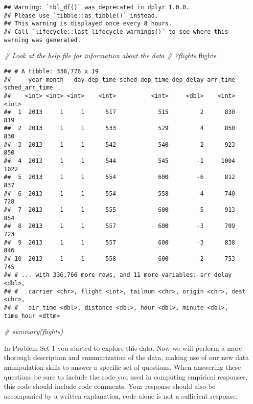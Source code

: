 \documentclass[
]{article}
\newenvironment{Shaded}{\begin{snugshade}}{\end{snugshade}}
\newcommand{\CommentTok}[1]{\textcolor[rgb]{0.56,0.35,0.01}{\textit{#1}}}
\newcommand{\NormalTok}[1]{#1}
\begin{document}
\begin{verbatim}
## Warning: `tbl_df()` was deprecated in dplyr 1.0.0.
## Please use `tibble::as_tibble()` instead.
## This warning is displayed once every 8 hours.
## Call `lifecycle::last_lifecycle_warnings()` to see where this warning was generated.
\end{verbatim}

\begin{Shaded}
\begin{Highlighting}[]
\CommentTok{\# Look at the help file for information about the data}
\CommentTok{\# ?flights}
\NormalTok{flights}
\end{Highlighting}
\end{Shaded}

\begin{verbatim}
## # A tibble: 336,776 x 19
##     year month   day dep_time sched_dep_time dep_delay arr_time sched_arr_time
##    <int> <int> <int>    <int>          <int>     <dbl>    <int>          <int>
##  1  2013     1     1      517            515         2      830            819
##  2  2013     1     1      533            529         4      850            830
##  3  2013     1     1      542            540         2      923            850
##  4  2013     1     1      544            545        -1     1004           1022
##  5  2013     1     1      554            600        -6      812            837
##  6  2013     1     1      554            558        -4      740            728
##  7  2013     1     1      555            600        -5      913            854
##  8  2013     1     1      557            600        -3      709            723
##  9  2013     1     1      557            600        -3      838            846
## 10  2013     1     1      558            600        -2      753            745
## # ... with 336,766 more rows, and 11 more variables: arr_delay <dbl>,
## #   carrier <chr>, flight <int>, tailnum <chr>, origin <chr>, dest <chr>,
## #   air_time <dbl>, distance <dbl>, hour <dbl>, minute <dbl>, time_hour <dttm>
\end{verbatim}

\begin{Shaded}
\begin{Highlighting}[]
\CommentTok{\# summary(flights)}
\end{Highlighting}
\end{Shaded}

In Problem Set 1 you started to explore this data. Now we will perform a
more thorough description and summarization of the data, making use of
our new data manipulation skills to answer a specific set of questions.
When answering these questions be sure to include the code you used in
computing empirical responses, this code should include code comments.
Your response should also be accompanied by a written explanation, code
alone is not a sufficient response.
\end{document}
